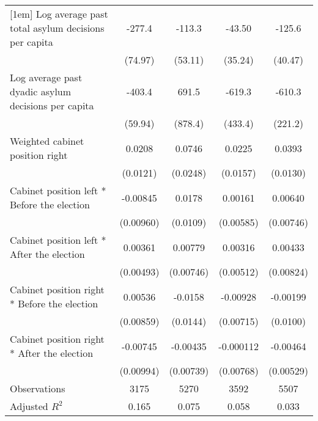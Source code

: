 \begin{table}[htbp]
\begin{tabular}{l*{4}{c}}
[1em]
Log average past total asylum decisions per capita&      -277.4\sym{**} &      -113.3\sym{*}  &      -43.50         &      -125.6\sym{**} \\
                    &     (74.97)         &     (53.11)         &     (35.24)         &     (40.47)         \\
[1em]
Log average past dyadic asylum decisions per capita&      -403.4\sym{***}&       691.5         &      -619.3         &      -610.3\sym{*}  \\
                    &     (59.94)         &     (878.4)         &     (433.4)         &     (221.2)         \\
[1em]
Weighted cabinet position right&      0.0208         &      0.0746\sym{**} &      0.0225         &      0.0393\sym{**} \\
                    &    (0.0121)         &    (0.0248)         &    (0.0157)         &    (0.0130)         \\
[1em]
Cabinet position left * Before the election&    -0.00845         &      0.0178         &     0.00161         &     0.00640         \\
                    &   (0.00960)         &    (0.0109)         &   (0.00585)         &   (0.00746)         \\
[1em]
Cabinet position left * After the election&     0.00361         &     0.00779         &     0.00316         &     0.00433         \\
                    &   (0.00493)         &   (0.00746)         &   (0.00512)         &   (0.00824)         \\
[1em]
Cabinet position right * Before the election&     0.00536         &     -0.0158         &    -0.00928         &    -0.00199         \\
                    &   (0.00859)         &    (0.0144)         &   (0.00715)         &    (0.0100)         \\
[1em]
Cabinet position right * After the election&    -0.00745         &    -0.00435         &   -0.000112         &    -0.00464         \\
                    &   (0.00994)         &   (0.00739)         &   (0.00768)         &   (0.00529)         \\
\hline
Observations        &        3175         &        5270         &        3592         &        5507         \\
Adjusted \(R^{2}\)  &       0.165         &       0.075         &       0.058         &       0.033         \\

\end{tabular}
\end{table}
